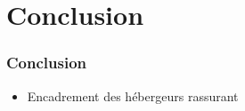     \section{Conclusion}

\begin{frame}
\frametitle{Conclusion}
\begin{itemize}
    \itemsep2em
    \item Encadrement des hébergeurs rassurant
\end{itemize}
\end{frame}
